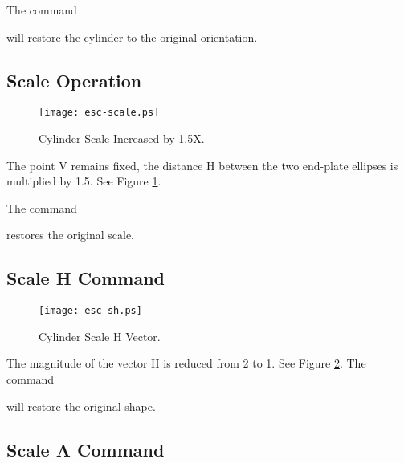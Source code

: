 The command


will restore the cylinder to the original orientation.

\subsection{Scale Operation}

\begin{figure}
\centering \texttt{[image: esc-scale.ps]}
\caption{Cylinder Scale Increased by 1.5X.}
\label{esc-scale}
\end{figure}


The point V remains fixed, the distance H between the two end-plate ellipses
is multiplied by 1.5.
See Figure \ref{esc-scale}.

The command


restores the original scale.

\subsection{Scale H Command}

\begin{figure}
\centering \texttt{[image: esc-sh.ps]}
\caption{Cylinder Scale H Vector.}
\label{esc-sh}
\end{figure}


The magnitude of the vector H is reduced from 2 to 1.
See Figure \ref{esc-sh}.  The command


will restore the original shape.

\subsection{Scale A Command}

